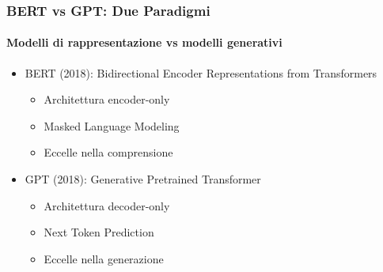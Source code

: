 %
\begin{frame}[t,fragile] \frametitle{BERT vs GPT: Due Paradigmi}
	{\scriptsize
		\onslide<1->
            \framesubtitle{Modelli di rappresentazione vs modelli generativi}
            \vspace*{-10pt}
	    	\begin{minipage}[t]{\textwidth}
				\begin{minipage}[t]{0.6\textwidth}
	    			\begin{itemize}[leftmargin=10pt,align=right]
						\onslide<2->\item[\alert{\faHandORight}] \alert{BERT (2018):} Bidirectional Encoder Representations from Transformers
						\begin{itemize}[leftmargin=10pt,align=right]
							\item[\alert{\faHandORight}] Architettura encoder-only
							\item[\alert{\faHandORight}] Masked Language Modeling
							\item[\alert{\faHandORight}] Eccelle nella comprensione
						\end{itemize}
						\item[\alert{\faHandORight}] \alert{GPT (2018):} Generative Pretrained Transformer
						\begin{itemize}[leftmargin=10pt,align=right]
							\item[\alert{\faHandORight}] Architettura decoder-only
							\item[\alert{\faHandORight}] Next Token Prediction
							\item[\alert{\faHandORight}] Eccelle nella generazione
						\end{itemize}
					\end{itemize}
            	\end{minipage}
	    	\end{minipage}
	}
\end{frame}
%
